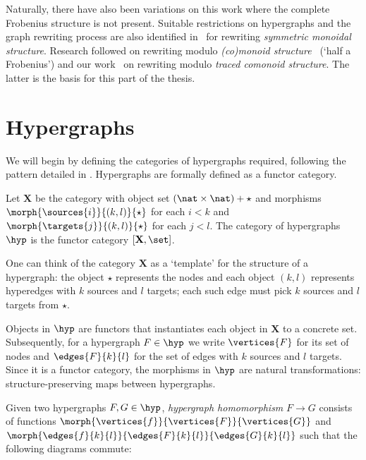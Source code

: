
Naturally, there have also been variations on this work where the complete
Frobenius structure is not present.
Suitable restrictions on hypergraphs and the graph rewriting process are also
identified in~\cite{bonchi2016rewriting} for rewriting
\emph{symmetric monoidal structure}.
Research followed on rewriting modulo
\emph{(co)monoid structure}~\cite{milosavljevic2023string} (`half a Frobenius')
and our work~\cite{ghica2023rewriting} on rewriting modulo
\emph{traced comonoid structure}.
The latter is the basis for this part of the thesis.

\section{Hypergraphs}

We will begin by defining the categories of hypergraphs required, following the
pattern detailed in \cite{bonchi2022string}.
Hypergraphs are formally defined as a functor category.

\begin{definition}
    Let \(\mathbf{X}\) be the category with object set
    \((\nat \times \nat) + \star\) and morphisms
    \(\morph{\sources{i}}{(k,l)}{\star}\) for each \(i < k\)
    and \(\morph{\targets{j}}{(k,l)}{\star}\) for each \(j < l\).
    The category of hypergraphs \(\hyp\) is the functor category
    \([\mathbf{X}, \set]\).
\end{definition}

One can think of the category \(\mathbf{X}\) as a `template' for the structure
of a hypergraph: the object \(\star\) represents the nodes and each object
\((k, l)\) represents hyperedges with \(k\) sources and \(l\) targets; each such
edge must pick \(k\) sources and \(l\) targets from \(\star\).

Objects in \(\hyp\) are functors that instantiates each object in \(\mathbf{X}\)
to a concrete set.
Subsequently, for a hypergraph \(F \in \hyp\) we write \(\vertices{F}\) for its
set of nodes and \(\edges{F}{k}{l}\) for the set of edges with \(k\) sources and
\(l\) targets.
Since it is a functor category, the morphisms in \(\hyp\) are natural
transformations: structure-preserving maps between hypergraphs.

\begin{definition}
    Given two hypergraphs \(F, G \in \hyp\), \emph{hypergraph homomorphism}
    \(F \to G\) consists of functions
    \(\morph{\vertices{f}}{\vertices{F}}{\vertices{G}}\) and
    \(\morph{\edges{f}{k}{l}}{\edges{F}{k}{l}}{\edges{G}{k}{l}}\) such that the
    following diagrams commute:
    
\end{definition}

